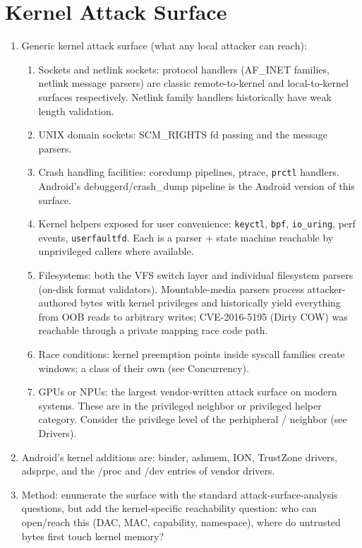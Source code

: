 \documentclass[12pt]{Training}
\begin{document}
\section*{Kernel Attack Surface}
\begin{enumerate}
    \item Generic kernel attack surface (what any local attacker can reach):
    \begin{enumerate}
        \item Sockets and netlink sockets: protocol handlers (AF\_INET families, netlink message parsers) are classic remote-to-kernel and local-to-kernel surfaces respectively. Netlink family handlers historically have weak length validation.
        \item UNIX domain sockets: SCM\_RIGHTS fd passing and the message parsers.
        \item Crash handling facilities: coredump pipelines, ptrace, \lstinline{prctl} handlers. Android's debuggerd/crash\_dump pipeline is the Android version of this surface.
        \item Kernel helpers exposed for user convenience: \lstinline{keyctl}, \lstinline{bpf}, \lstinline{io_uring}, perf events, \lstinline{userfaultfd}. Each is a parser + state machine reachable by unprivileged callers where available.
        \item Filesystems: both the VFS switch layer and individual filesystem parsers (on-disk format validators). Mountable-media parsers process attacker-authored bytes with kernel privileges and historically yield everything from OOB reads to arbitrary writes; CVE-2016-5195 (Dirty COW) was reachable through a private mapping race code path.
        \item Race conditions: kernel preemption points inside syscall families create windows; a class of their own (see Concurrency).
        \item GPUs or NPUs: the largest vendor-written attack surface on modern systems. These are in the privileged neighbor or privileged helper category. Consider the privilege level of the perhipheral / neighbor (see Drivers).
    \end{enumerate}
    \item Android's kernel additions are: binder, ashmem, ION, TrustZone drivers, adsprpc, and the /proc and /dev entries of vendor drivers.
    \item Method: enumerate the surface with the standard attack-surface-analysis questions, but add the kernel-specific reachability question: who can open/reach this (DAC, MAC, capability, namespace), where do untrusted bytes first touch kernel memory?

\end{enumerate}
\end{document}
